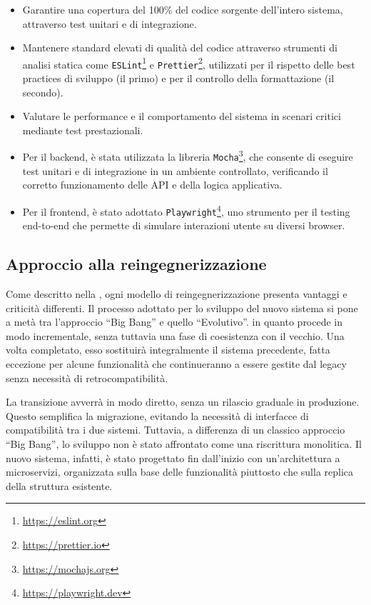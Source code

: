 \begin{itemize}
  \item Garantire una copertura del 100\% del codice sorgente dell'intero sistema, attraverso test unitari e di integrazione.
  \item Mantenere standard elevati di qualità del codice attraverso strumenti di analisi statica come \texttt{ESLint}\footnote{\url{https://eslint.org}} e \texttt{Prettier}\footnote{\url{https://prettier.io}}, utilizzati per il rispetto delle best practices di sviluppo (il primo) e per il controllo della formattazione (il secondo).
  \item Valutare le performance e il comportamento del sistema in scenari critici mediante test prestazionali.
  \item Per il backend, è stata utilizzata la libreria \texttt{Mocha}\footnote{\url{https://mochajs.org}}, che consente di eseguire test unitari e di integrazione in un ambiente controllato, verificando il corretto funzionamento delle API e della logica applicativa.
  \item Per il frontend, è stato adottato \texttt{Playwright}\footnote{\url{https://playwright.dev}}, uno strumento per il testing end-to-end che permette di simulare interazioni utente su diversi browser.
\end{itemize}

\subsection{Approccio alla reingegnerizzazione}
Come descritto nella , ogni modello di reingegnerizzazione presenta vantaggi e criticità differenti. Il processo adottato per lo sviluppo del nuovo sistema si pone a metà tra l'approccio ``Big Bang'' e quello ``Evolutivo''. in quanto procede in modo incrementale, senza tuttavia una fase di coesistenza con il vecchio. Una volta completato, esso sostituirà integralmente il sistema precedente, fatta eccezione per alcune funzionalità che continueranno a essere gestite dal legacy senza necessità di retrocompatibilità.

La transizione avverrà in modo diretto, senza un rilascio graduale in produzione. Questo semplifica la migrazione, evitando la necessità di interfacce di compatibilità tra i due sistemi. Tuttavia, a differenza di un classico approccio ``Big Bang'', lo sviluppo non è stato affrontato come una riscrittura monolitica. Il nuovo sistema, infatti, è stato progettato fin dall'inizio con un'architettura a microservizi, organizzata sulla base delle funzionalità piuttosto che sulla replica della struttura esistente.

